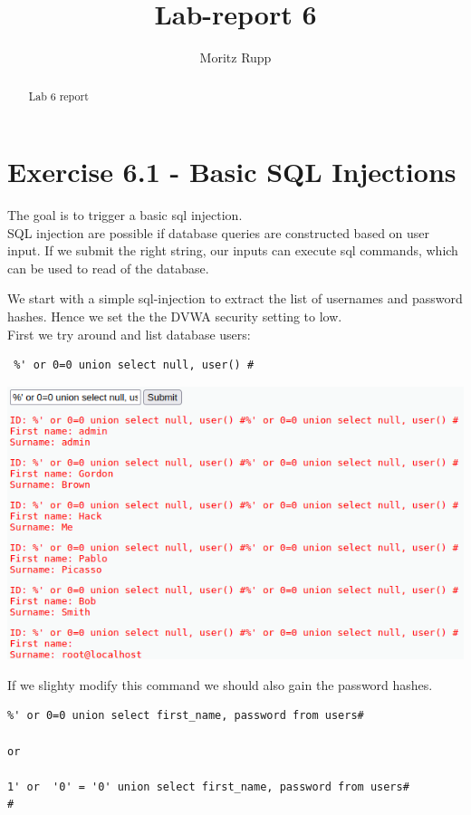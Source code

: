 \documentclass[a4paper,10pt]{article}
\title{Lab-report 6}
\author{Moritz Rupp}
\begin{document}
\maketitle

\begin{abstract}
\begin{center}
Lab 6 report

\end{center}
\tableofcontents
\end{abstract}
\newpage
\section{Exercise 6.1 - Basic SQL Injections}
The goal is to trigger a basic sql injection.\\
SQL injection are possible if database queries are constructed based on user input. If we submit the right string, our inputs can execute sql commands, which can be used to read of the database. 

We start with a simple sql-injection to extract the list of usernames and password hashes. Hence we set the the DVWA security setting to low. \\
First we try around and list database users:\\
\begin{verbatim}
 %' or 0=0 union select null, user() #

\end{verbatim}

\begin{center}
 \includegraphics[scale=0.4]{first.png}
\end{center}
If we slighty modify this command we should also gain the password hashes.
\begin{verbatim}
%' or 0=0 union select first_name, password from users#

or

1' or  '0' = '0' union select first_name, password from users#
#
\end{verbatim}
\end{document}
